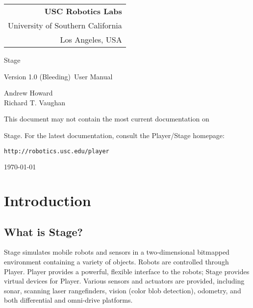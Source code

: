 \documentclass[11pt]{report}
\def\VERSION {1.0 (Bleeding)}
\begin{document}
\setcounter{page}{0}

\titlepage

\begin{flushright}
\begin{tabular}{r}
{\bf USC Robotics Labs}\\
University of Southern California\\
Los Angeles, USA\\
\end{tabular}
\end{flushright}

\vspace{6cm}
\centerline{\huge{Stage}}
\vspace{0.5cm}
\centerline{\large{Version \VERSION\ User Manual}}
\vspace{2cm}

\centerline{\large Andrew Howard \\ Richard T. Vaughan}
\vspace{1cm}

\centerline{This document may not contain the most current documentation on}
\centerline{Stage.  For the latest documentation, consult the Player/Stage homepage:}
\centerline{{\tt http://robotics.usc.edu/player}}

\vspace{4cm}

\centerline{\today}


\setcounter{page}{0}


\chapter{Introduction}

  \section{What is Stage?}

    Stage simulates mobile robots and sensors in a two-dimensional
    bitmapped environment containing a variety of objects. Robots are
    controlled through Player. Player provides a powerful, flexible
    interface to the robots; Stage provides virtual devices for
    Player.  Various sensors and actuators are provided, including
    sonar, scanning laser rangefinders, vision (color blob detection),
    odometry, and both differential and omni-drive platforms.
\end{document}

